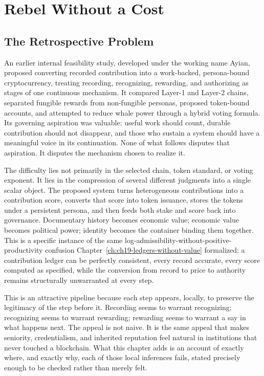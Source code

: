 
\chapter{Rebel Without a Cost}
\label{ch:ch20-rebel-without-a-cost}
\section{The Retrospective Problem}

An earlier internal feasibility study, developed under the working name Ayian, proposed converting recorded contribution into a work-backed, persona-bound cryptocurrency, treating recording, recognizing, rewarding, and authorizing as stages of one continuous mechanism. It compared Layer-1 and Layer-2 chains, separated fungible rewards from non-fungible personas, proposed token-bound accounts, and attempted to reduce whale power through a hybrid voting formula. Its governing aspiration was valuable: useful work should count, durable contribution should not disappear, and those who sustain a system should have a meaningful voice in its continuation. None of what follows disputes that aspiration. It disputes the mechanism chosen to realize it.

The difficulty lies not primarily in the selected chain, token standard, or voting exponent. It lies in the compression of several different judgments into a single scalar object. The proposed system turns heterogeneous contributions into a contribution score, converts that score into token issuance, stores the tokens under a persistent persona, and then feeds both stake and score back into governance. Documentary history becomes economic value; economic value becomes political power; identity becomes the container binding them together. This is a specific instance of the same log-admissibility-without-positive-productivity confusion Chapter~\ref{ch:ch19-ledgers-without-value} formalized: a contribution ledger can be perfectly consistent, every record accurate, every score computed as specified, while the conversion from record to price to authority remains structurally unwarranted at every step.

This is an attractive pipeline because each step appears, locally, to preserve the legitimacy of the step before it. Recording seems to warrant recognizing; recognizing seems to warrant rewarding; rewarding seems to warrant a say in what happens next. The appeal is not naive. It is the same appeal that makes seniority, credentialism, and inherited reputation feel natural in institutions that never touched a blockchain. What this chapter adds is an account of exactly where, and exactly why, each of those local inferences fails, stated precisely enough to be checked rather than merely felt.

